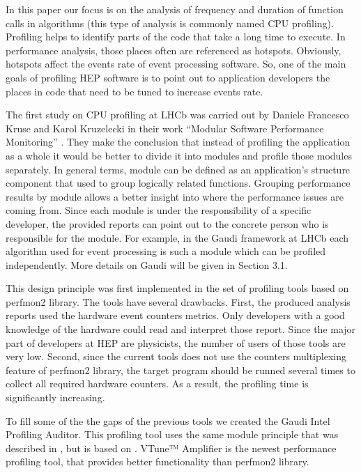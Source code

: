 \documentclass[a4paper]{jpconf}
\begin{document}
In this paper our focus is on the analysis of frequency and duration of function calls in algorithms (this type of analysis is commonly named CPU profiling). Profiling helps to identify parts of the code that take a long time to execute. In performance analysis, those places often are referenced as hotspots. Obviously,  hotspots affect the events rate of event processing software. So, one of the main goals of profiling HEP software is to point out to application developers the places in code that need to be tuned to increase events rate.

The first study on CPU profiling at LHCb was carried out by Daniele Francesco Kruse and Karol Kruzelecki in their work “Modular Software Performance Monitoring” \cite{modular}. They make the conclusion that instead of profiling the application as a whole it would be better to divide it into modules and profile those modules separately. In general terms,  module can be defined as an application’s structure component that used to group logically related functions.  Grouping performance results by module allows a better insight into where the performance issues are coming from. Since each module is under the responsibility of a specific developer,  the provided reports can point out to the concrete person who is responsible for the module. For example, in the Gaudi \cite{gaudi} framework at LHCb each algorithm used for event processing is such a module which can be profiled independently. More details on Gaudi will be given in Section 3.1. 

This design principle was first implemented in the set of profiling tools based on perfmon2 \cite{perfmon2} library.  The tools have several drawbacks. First, the produced analysis reports  used the  hardware event counters metrics. Only developers with a good knowledge of the hardware could read and interpret those report. Since the major part of developers at HEP are physicists, the number of users of those tools are very low. Second, since the current tools does not use the counters multiplexing feature of perfmon2 library, the target program should be runned several times to collect all required hardware counters. As a result, the profiling time is significantly increasing.

To fill some of the the gaps of the previous tools we created the Gaudi Intel Profiling Auditor. This profiling tool uses the same module principle that was described in \cite{modular},  but is based on \iamp \cite{vtune}. VTune™ Amplifier is the newest performance profiling tool, that provides better functionality than perfmon2 library. 
\end{document}
